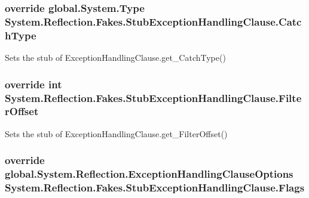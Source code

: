 \hypertarget{class_system_1_1_reflection_1_1_fakes_1_1_stub_exception_handling_clause_a96f6d50769adba9eace7d364c011a29b}{
\subsubsection[{Catch\-Type}]{\setlength{\rightskip}{0pt plus 5cm}override global.\-System.\-Type System.\-Reflection.\-Fakes.\-Stub\-Exception\-Handling\-Clause.\-Catch\-Type\hspace{0.3cm}{\ttfamily [get]}}}\label{class_system_1_1_reflection_1_1_fakes_1_1_stub_exception_handling_clause_a96f6d50769adba9eace7d364c011a29b}


Sets the stub of Exception\-Handling\-Clause.\-get\-\_\-\-Catch\-Type()

\hypertarget{class_system_1_1_reflection_1_1_fakes_1_1_stub_exception_handling_clause_ade916bd74c66d00d567d6ef13d4bbfe5}{
\subsubsection[{Filter\-Offset}]{\setlength{\rightskip}{0pt plus 5cm}override int System.\-Reflection.\-Fakes.\-Stub\-Exception\-Handling\-Clause.\-Filter\-Offset\hspace{0.3cm}{\ttfamily [get]}}}\label{class_system_1_1_reflection_1_1_fakes_1_1_stub_exception_handling_clause_ade916bd74c66d00d567d6ef13d4bbfe5}


Sets the stub of Exception\-Handling\-Clause.\-get\-\_\-\-Filter\-Offset()

\hypertarget{class_system_1_1_reflection_1_1_fakes_1_1_stub_exception_handling_clause_ac0ed2b3c711e759e4181ed6294bc591f}{
\subsubsection[{Flags}]{\setlength{\rightskip}{0pt plus 5cm}override global.\-System.\-Reflection.\-Exception\-Handling\-Clause\-Options System.\-Reflection.\-Fakes.\-Stub\-Exception\-Handling\-Clause.\-Flags\hspace{0.3cm}{\ttfamily [get]}}}\label{class_system_1_1_reflection_1_1_fakes_1_1_stub_exception_handling_clause_ac0ed2b3c711e759e4181ed6294bc591f}


